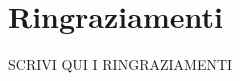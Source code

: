 \documentclass[main]{subfiles}
\begin{document}
\section*{Ringraziamenti}
SCRIVI QUI I RINGRAZIAMENTI 
\end{document}
